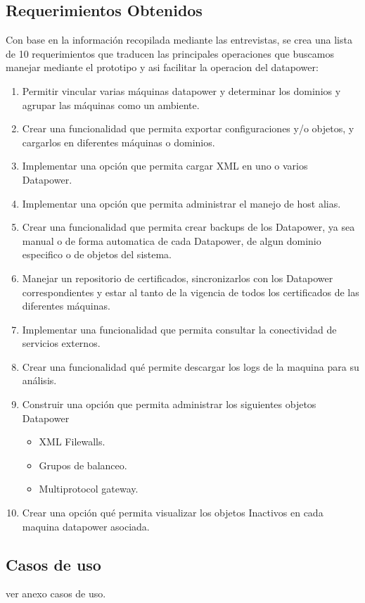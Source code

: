 \subsection{Requerimientos Obtenidos}
Con base en la información recopilada mediante las entrevistas, se crea una lista de 10 requerimientos que traducen las principales operaciones que buscamos manejar mediante el prototipo y asi facilitar la operacion del datapower:
\begin{enumerate}
  \item Permitir vincular varias máquinas datapower y determinar los dominios y agrupar las máquinas como un ambiente.
  \item Crear una funcionalidad que permita exportar configuraciones y/o objetos, y cargarlos en diferentes máquinas o dominios.
  \item Implementar una opción que permita cargar XML en uno o varios Datapower.
  \item Implementar una opción que permita administrar el manejo de host alias.
  \item Crear una funcionalidad que permita crear backups de los Datapower, ya sea manual o de forma automatica de cada Datapower, de algun dominio especifico o de objetos del sistema.
  \item Manejar un repositorio de certificados, sincronizarlos con los Datapower correspondientes y estar al tanto de la vigencia de todos los certificados de las diferentes máquinas.
  \item Implementar una funcionalidad que permita consultar la conectividad de servicios externos.
  \item Crear una funcionalidad qué permite descargar los logs de la maquina para su análisis.
  \item Construir una opción que permita administrar los siguientes objetos Datapower
  \begin{itemize}
    \item XML Filewalls.
    \item Grupos de balanceo.
    \item Multiprotocol gateway.
  \end{itemize}
  \item Crear una opción qué permita visualizar los objetos Inactivos en cada maquina datapower asociada.
\end{enumerate}
\subsection{Casos de uso}
ver anexo casos de uso.
\newpage
